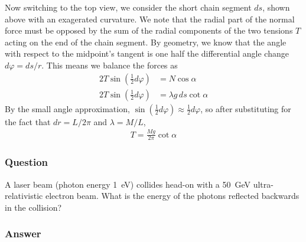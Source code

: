 Now switching to the top view, we consider the short chain segment $ds$, shown
above with an exagerated curvature. We note that the radial part of the
normal force must be opposed by the sum of the radial components of the two
tensions $T$ acting on the end of the chain segment. By geometry, we know that
the angle with respect to the midpoint's tangent is one half the differential
angle change $dφ = ds/r$. This means we balance the forces as
\begin{align*}
    2T\sin(\frac 12 dφ) &= N \cos α \\
    2T\sin(\frac 12 dφ) &= λg\,ds \cot α
\end{align*}
By the small angle approximation, $\sin (\frac 12 dφ) ≈ \frac 12 dφ$, so after
substituting for the fact that $dr = L/2π$ and $λ = M/L$,
\begin{align}
    \boxed{
    T = \frac{Mg}{2π} \cot α
    }
\end{align}

\subsubsection{Question}

A laser beam (photon energy \SI{1}{\eV}) collides head-on with a \SI{50}{\GeV}
ultra-relativistic electron beam. What is the energy of the photons reflected
backwards in the collision?

\subsubsection{Answer}

